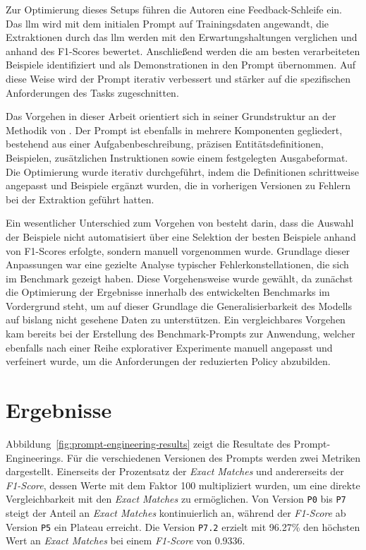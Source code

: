 Zur Optimierung dieses Setups führen die Autoren eine Feedback-Schleife ein.
Das \gls{llm} wird mit dem initialen Prompt auf Trainingsdaten angewandt, die Extraktionen durch das \gls{llm} werden mit den Erwartungshaltungen verglichen und anhand des F1-Scores bewertet.
Anschließend werden die am besten verarbeiteten Beispiele identifiziert und als Demonstrationen in den Prompt übernommen.
Auf diese Weise wird der Prompt iterativ verbessert und stärker auf die spezifischen Anforderungen des Tasks zugeschnitten\autocite{cheng_novel_2024}.

Das Vorgehen in dieser Arbeit orientiert sich in seiner Grundstruktur an der Methodik von \citeauthor{cheng_novel_2024}\autocite{cheng_novel_2024}.
Der Prompt ist ebenfalls in mehrere Komponenten gegliedert, bestehend aus einer Aufgabenbeschreibung, präzisen Entitätsdefinitionen, Beispielen, zusätzlichen Instruktionen sowie einem festgelegten Ausgabeformat.
Die Optimierung wurde iterativ durchgeführt, indem die Definitionen schrittweise angepasst und Beispiele ergänzt wurden, die in vorherigen Versionen zu Fehlern bei der Extraktion geführt hatten.

Ein wesentlicher Unterschied zum Vorgehen von \citeauthor{cheng_novel_2024}\autocite{cheng_novel_2024} besteht darin, dass die Auswahl der Beispiele nicht automatisiert über eine Selektion der besten Beispiele anhand von F1-Scores erfolgte, sondern manuell vorgenommen wurde.
Grundlage dieser Anpassungen war eine gezielte Analyse typischer Fehlerkonstellationen, die sich im Benchmark gezeigt haben.
Diese Vorgehensweise wurde gewählt, da zunächst die Optimierung der Ergebnisse innerhalb des entwickelten Benchmarks im Vordergrund steht, um auf dieser Grundlage die Generalisierbarkeit des Modells auf bislang nicht gesehene Daten zu unterstützen.
Ein vergleichbares Vorgehen kam bereits bei der Erstellung des Benchmark-Prompts zur Anwendung, welcher ebenfalls nach einer Reihe explorativer Experimente manuell angepasst und verfeinert wurde, um die Anforderungen der reduzierten Policy abzubilden.


\section{Ergebnisse}

Abbildung~\ref{fig:prompt-engineering-results} zeigt die Resultate des Prompt-Engineerings.
Für die verschiedenen Versionen des Prompts werden zwei Metriken dargestellt.
Einerseits der Prozentsatz der \textit{Exact Matches} und andererseits der \textit{F1-Score}, dessen Werte mit dem Faktor \num{100} multipliziert wurden, um eine direkte Vergleichbarkeit mit den \textit{Exact Matches} zu ermöglichen.
Von Version \texttt{P0} bis \texttt{P7} steigt der Anteil an \textit{Exact Matches} kontinuierlich an, während der \textit{F1-Score} ab Version \texttt{P5} ein Plateau erreicht.
Die Version \texttt{P7.2} erzielt mit \num{96.27}\% den höchsten Wert an \textit{Exact Matches} bei einem \textit{F1-Score} von \num{0.9336}.

